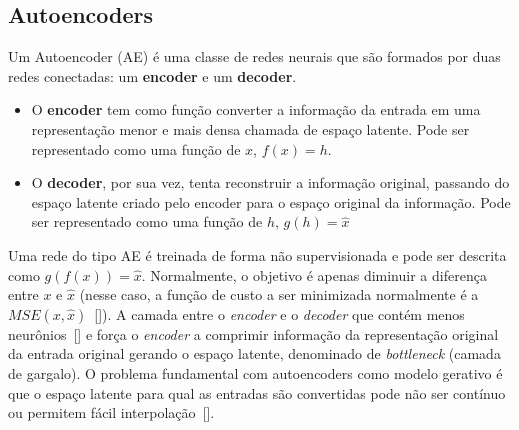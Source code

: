 \subsection{Autoencoders}
Um Autoencoder (\acrshort{AE}) é uma classe de redes neurais que são formados por duas redes conectadas: um \textbf{encoder} e um \textbf{decoder}.
\begin{itemize}
\item O \textbf{encoder} tem como função converter a informação da entrada em uma representação menor e mais densa chamada de espaço latente. Pode ser representado como uma função de $x$, $f(x) = h$.
\item O \textbf{decoder}, por sua vez, tenta reconstruir a informação original, passando do espaço latente criado pelo encoder para o espaço original da informação. Pode ser representado como uma função de $h$, $g(h) = \hat{x}$
\end{itemize} 
Uma rede do tipo \acrshort{AE} é treinada de forma não supervisionada e pode ser descrita como $g(f(x)) = \hat{x}$. Normalmente, o objetivo é apenas diminuir a diferença entre $x$ e $\hat{x}$ (nesse caso, a função de custo a ser minimizada normalmente é a $MSE(x, \hat{x})$~[]). A camada entre o \textit{encoder} e o \textit{decoder} que contém menos neurônios~[] e força o \textit{encoder} a comprimir informação da representação original da entrada original gerando o espaço latente, denominado de \textit{bottleneck} (camada de gargalo). 
O problema fundamental com autoencoders como modelo gerativo é que o espaço latente para qual as entradas são convertidas pode não ser contínuo ou permitem fácil interpolação~[].


